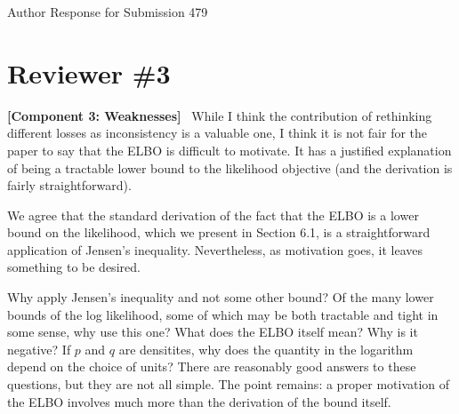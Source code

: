 \begin{center}
    {\Large
    Author Response for Submission 479}\\
\end{center}
\section*{Reviewer \#3}

\begin{reviewer says}
    \textbf{[Component 3: Weaknesses]}~
    While I think the contribution of rethinking different losses as inconsistency is a valuable one, I think it is not fair for the paper to say that the ELBO is difficult to motivate. It has a justified explanation of being a tractable lower bound to the likelihood objective (and the derivation is fairly straightforward).
\end{reviewer says}

We agree that the standard derivation of the fact that the ELBO is a lower bound on the likelihood, which we present in Section 6.1, is a straightforward application of Jensen’s inequality.
Nevertheless, as motivation goes, it leaves something to be desired.

Why apply Jensen’s inequality and not some other bound?
Of the many lower bounds of the log likelihood, some of which may be both tractable and tight in some sense, why use this one?
What does the ELBO itself mean? Why is it negative?  If $p$ and $q$ are densitites, why does the quantity in the logarithm depend on the choice of units?
There are reasonably good answers to these questions, but they are not all simple.
The point remains: a proper motivation of the ELBO involves much more than the derivation of the bound itself.

